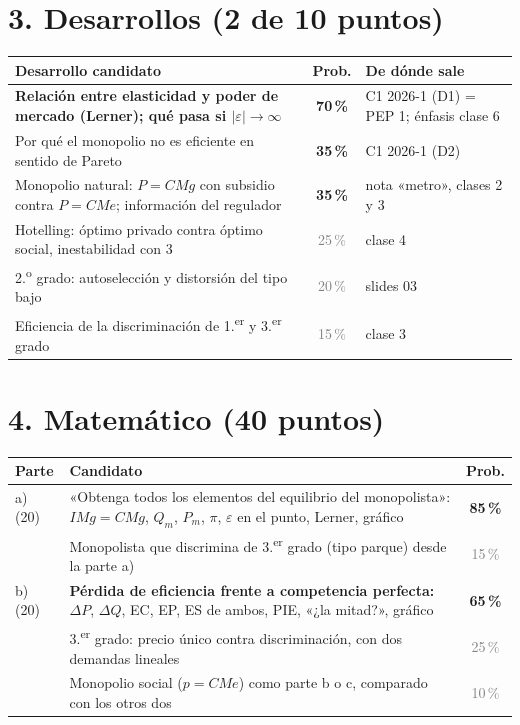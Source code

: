 \documentclass[11pt]{article}
\newcommand{\alta}[1]{\textbf{\textcolor{red!70!black}{#1}}}
\newcommand{\media}[1]{\textbf{\textcolor{orange!80!black}{#1}}}
\newcommand{\baja}[1]{\textcolor{gray}{#1}}
\begin{document}
\section*{3. Desarrollos (2 de 10 puntos)}

\begin{center}
\renewcommand{\arraystretch}{1.25}
\begin{tabularx}{\textwidth}{@{}Xcl@{}}
\toprule
Desarrollo candidato & Prob. & De dónde sale \\
\midrule
\textbf{Relación entre elasticidad y poder de mercado (Lerner); qué pasa si $|\varepsilon| \to \infty$} & \alta{70\,\%} & C1 2026-1 (D1) = PEP 1; énfasis clase 6 \\
Por qué el monopolio no es eficiente en sentido de Pareto & \media{35\,\%} & C1 2026-1 (D2) \\
Monopolio natural: $P = CMg$ con subsidio contra $P = CMe$; información del regulador & \media{35\,\%} & nota «metro», clases 2 y 3 \\
Hotelling: óptimo privado contra óptimo social, inestabilidad con 3 & \baja{25\,\%} & clase 4 \\
2.\textsuperscript{o} grado: autoselección y distorsión del tipo bajo & \baja{20\,\%} & slides 03 \\
Eficiencia de la discriminación de 1.\textsuperscript{er} y 3.\textsuperscript{er} grado & \baja{15\,\%} & clase 3 \\
\bottomrule
\end{tabularx}
\end{center}

\section*{4. Matemático (40 puntos)}

\begin{center}
\renewcommand{\arraystretch}{1.25}
\begin{tabularx}{\textwidth}{@{}lXc@{}}
\toprule
Parte & Candidato & Prob. \\
\midrule
a) (20) & «Obtenga todos los elementos del equilibrio del monopolista»: $IMg = CMg$, $Q_m$, $P_m$, $\pi$, $\varepsilon$ en el punto, Lerner, gráfico & \alta{85\,\%} \\
 & Monopolista que discrimina de 3.\textsuperscript{er} grado (tipo parque) desde la parte a) & \baja{15\,\%} \\
\midrule
b) (20) & \textbf{Pérdida de eficiencia frente a competencia perfecta:} $\Delta P$, $\Delta Q$, EC, EP, ES de ambos, PIE, «¿la mitad?», gráfico & \alta{65\,\%} \\
 & 3.\textsuperscript{er} grado: precio único contra discriminación, con dos demandas lineales & \baja{25\,\%} \\
 & Monopolio social ($p = CMe$) como parte b o c, comparado con los otros dos & \baja{10\,\%} \\
\bottomrule
\end{tabularx}
\end{center}
\end{document}
